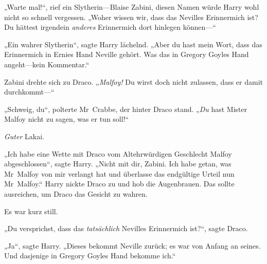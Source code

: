 „Warte mal!“, rief ein Slytherin—Blaise Zabini, diesen Namen würde Harry wohl nicht so schnell vergessen. „Woher wissen wir, dass das Nevilles Erinnermich ist? Du hättest irgendein \emph{anderes} Erinnermich dort hinlegen können—“

„Ein wahrer Slytherin“, sagte Harry lächelnd. „Aber du hast mein Wort, dass das Erinnermich in Ernies Hand Neville gehört. Was das in Gregory Goyles Hand angeht—kein Kommentar.“

Zabini drehte sich zu Draco. „\emph{Malfoy!} Du wirst doch nicht zulassen, dass er damit durchkommt—“

„Schweig, du“, polterte Mr~Crabbe, der hinter Draco stand. „\emph{Du} hast Mister Malfoy nicht zu sagen, was er tun soll!“

\emph{Guter} Lakai.

„Ich habe eine Wette mit Draco vom Altehrwürdigen Geschlecht Malfoy abgeschlossen“, sagte Harry. „Nicht mit dir, Zabini. Ich habe getan, was Mr~Malfoy von mir verlangt hat und überlasse das endgültige Urteil nun Mr~Malfoy.“ Harry nickte Draco zu und hob die Augenbrauen. Das sollte ausreichen, um Draco das Gesicht zu wahren.

Es war kurz still.

„Du versprichst, dass das \emph{tatsächlich} Nevilles Erinnermich ist?“, sagte Draco.

„Ja“, sagte Harry. „Dieses bekommt Neville zurück; es war von Anfang an seines. Und dasjenige in Gregory Goyles Hand bekomme ich.“

